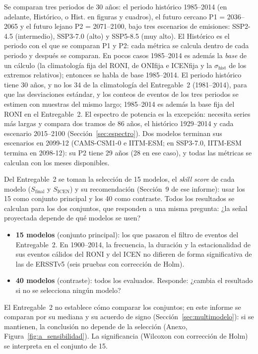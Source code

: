 \documentclass[11pt,a4paper]{article}
\begin{document}
Se comparan tres periodos de 30 años: el periodo histórico 1985--2014 (en adelante, Histórico, o Hist. en figuras y cuadros), el futuro cercano P1 = 2036--2065 y el futuro lejano P2 = 2071--2100, bajo tres escenarios de emisiones: SSP2-4.5 (intermedio), SSP3-7.0 (alto) y SSP5-8.5 (muy alto). 
El Histórico es el periodo con el que se comparan P1 y P2: cada métrica se calcula dentro de cada periodo y después se comparan. En pocos casos 1985--2014 es además la \emph{base} de un cálculo (la climatología fija del RONI, de ONIfija e ICENfija y la $\sigma_{\mathrm{hist}}$ de los extremos relativos); entonces se habla de base 1985--2014.
El periodo histórico tiene 30 años, y no los 34 de la climatología del Entregable~2 (1981--2014), para que las desviaciones estándar, y los conteos de eventos de los tres periodos se estimen con muestras del mismo largo; 1985--2014 es además la base fija del RONI en el Entregable~2. 
El espectro de potencia es la excepción: necesita series más largas y compara dos tramos de 86 años, el histórico 1929--2014 y cada escenario 2015--2100 (Sección~\ref{sec:espectro}). 
Dos modelos terminan sus escenarios en 2099-12 (CAMS-CSM1-0 e IITM-ESM; en SSP3-7.0, IITM-ESM termina en 2098-12): su P2 tiene 29 años (28 en ese caso), y todas las métricas se calculan con los meses disponibles.

Del Entregable~2 se toman la selección de 15 modelos, el \emph{skill score} de cada modelo ($S_{\mathrm{final}}$ y $S_{\mathrm{ICEN}}$) y su recomendación (Sección~9 de ese informe): usar los 15 como conjunto principal y los 40 como contraste.
Todos los resultados se calculan para los dos conjuntos, que responden a una misma pregunta: ¿la señal proyectada depende de qué modelos se usen?
\begin{itemize}[nosep]
\item \textbf{15 modelos} (conjunto principal): los que pasaron el filtro de eventos del Entregable~2. En 1900--2014, la frecuencia, la duración y la estacionalidad de sus eventos cálidos del RONI y del ICEN no difieren de forma significativa de las de ERSSTv5 (seis pruebas con corrección de Holm).
\item \textbf{40 modelos} (contraste): todos los evaluados. Responde: ¿cambia el resultado si no se selecciona ningún modelo?
\end{itemize}

El Entregable~2 no establece cómo comparar los conjuntos; en este informe se comparan por su mediana y su acuerdo de signo (Sección~\ref{sec:multimodelo}): si se mantienen, la conclusión no depende de la selección (Anexo, Figura~\ref{fig:a_sensibilidad}).
La significancia (Wilcoxon con corrección de Holm) se interpreta en el conjunto de 15.
\end{document}

